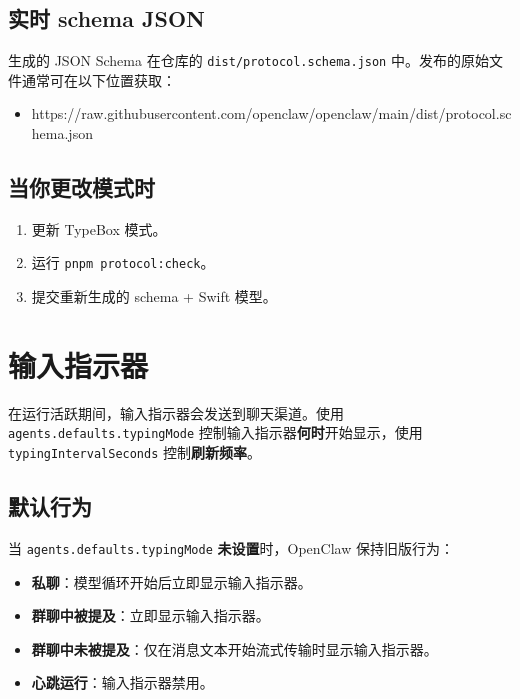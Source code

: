 \subsection{实时 schema JSON}


生成的 JSON Schema 在仓库的 \texttt{dist/protocol.schema.json} 中。发布的原始文件通常可在以下位置获取：

\begin{itemize}
  \item https://raw.githubusercontent.com/openclaw/openclaw/main/dist/protocol.schema.json
\end{itemize}


\subsection{当你更改模式时}


\begin{enumerate}
  \item 更新 TypeBox 模式。
  \item 运行 \texttt{pnpm protocol:check}。
  \item 提交重新生成的 schema + Swift 模型。
\end{enumerate}



\clearpage

\section{输入指示器}


在运行活跃期间，输入指示器会发送到聊天渠道。使用
\texttt{agents.defaults.typingMode} 控制输入指示器\textbf{何时}开始显示，使用 \texttt{typingIntervalSeconds}
控制\textbf{刷新频率}。

\subsection{默认行为}


当 \texttt{agents.defaults.typingMode} \textbf{未设置}时，OpenClaw 保持旧版行为：

\begin{itemize}
  \item \textbf{私聊}：模型循环开始后立即显示输入指示器。
  \item \textbf{群聊中被提及}：立即显示输入指示器。
  \item \textbf{群聊中未被提及}：仅在消息文本开始流式传输时显示输入指示器。
  \item \textbf{心跳运行}：输入指示器禁用。
\end{itemize}


